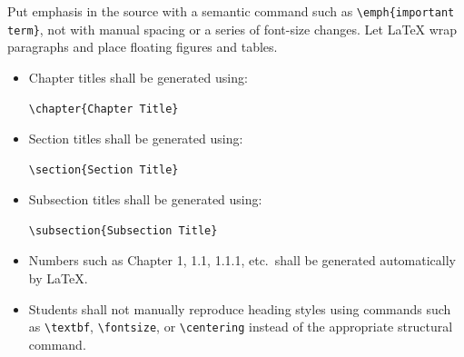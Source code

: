 {\RegExample Put emphasis in the source with a semantic command such as
\verb|\emph{important term}|, not with manual spacing or a series of
font-size changes. Let LaTeX wrap paragraphs and place floating
figures and tables.

\vspace{0.3cm}



\begin{itemize}[leftmargin=0.8cm, itemsep=3pt]

    \item Chapter titles shall be generated using:

\begin{verbatim}
\chapter{Chapter Title}
\end{verbatim}

    \item Section titles shall be generated using:

\begin{verbatim}
\section{Section Title}
\end{verbatim}

    \item Subsection titles shall be generated using:

\begin{verbatim}
\subsection{Subsection Title}
\end{verbatim}

    \item Numbers such as Chapter 1, 1.1, 1.1.1, etc.\ shall be
    generated automatically by \LaTeX{}.

    \item Students shall not manually reproduce heading styles using
    commands such as \verb|\textbf|, \verb|\fontsize|,
    or \verb|\centering| instead of the appropriate structural
    command.


\end{itemize}}
